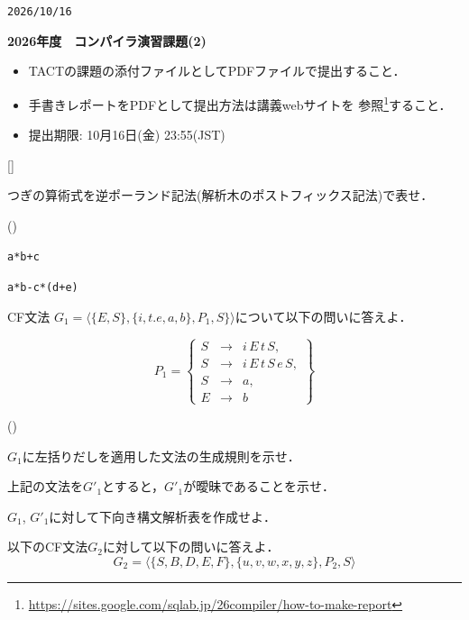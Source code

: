 \documentclass[dvipdfmx]{jarticle}
\newcounter{coffee}
\newcounter{bean}
\begin{document}
\begin{flushright}
  \texttt{2026/10/16}
\end{flushright}
\begin{center}{\bf\Large
    2026年度　コンパイラ演習課題(2)
  }\end{center}
\begin{itemize}
  \item TACTの課題の添付ファイルとしてPDFファイルで提出すること．
  \item 手書きレポートをPDFとして提出方法は講義webサイトを
        参照\footnote{\url{https://sites.google.com/sqlab.jp/26compiler/how-to-make-report}}すること．
  \item 提出期限: 10月16日(金) 23:55(JST)
\end{itemize}
\begin{list}{[]}{}
  \item つぎの算術式を逆ポーランド記法(解析木のポストフィックス記法)で表せ．
        \begin{list}{()}{}
          \item \texttt{a*b+c}
          \item \texttt{a*b-c*(d+e)}
        \end{list}
  \item CF文法 $G_1=\langle\{E,S\},\{i,t.e,a,b\},P_1,S\}\rangle$について以下の問いに答えよ．

        \[P_1=\left\{\begin{array}{rcl}
            S & \rightarrow & i\,E\,t\,S,       \\
            S & \rightarrow & i\,E\,t\,S\,e\,S, \\
            S & \rightarrow & a,                \\
            E & \rightarrow & b
          \end{array}\right\}\]
        \begin{list}{()}{}
          \item $G_1$に左括りだしを適用した文法の生成規則を示せ．
          \item 上記の文法を$G'_1$とすると，$G'_1$が曖昧であることを示せ．
          \item $G_1$, $G'_1$に対して下向き構文解析表を作成せよ．
        \end{list}
  \item 以下のCF文法$G_2$に対して以下の問いに答えよ．
        \[G_2=\langle\{S,B,D,E,F\},\{u,v,w,x,y,z\},P_2,S\rangle\]


\end{list}
\end{document}
